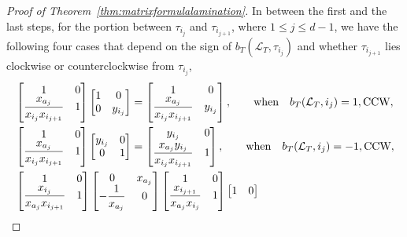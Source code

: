 \documentclass[pdftex]{sigma}
\numberwithin{equation}{section}
\theoremstyle{definition}
\begin{document}
\begin{proof}[Proof of Theorem~\ref{thm:matrixformulalamination}]
In between the first and the last steps, for the portion between $\tau_{i_j}$ and $\tau_{i_{j+1}}$, where $1\leq j\leq d-1$, we have the following four cases that depend on the sign of $b_T(\mathcal{L}_T, \tau_{i_j})$ and whether $\tau_{i_{j+1}}$ lies clockwise or counterclockwise from $\tau_{i_j}$,{\samepage
\begin{gather*}
\begin{split}
 &\begin{bmatrix}
 1 & 0\\
 \dfrac{x_{a_j}}{x_{i_j}x_{i_{j+1}}} & 1
 \end{bmatrix}
 \begin{bmatrix}
 1 & 0\\
 0 & y_{i_j}
 \end{bmatrix}=
 \begin{bmatrix}
 1 & 0\\
 \dfrac{x_{a_j}}{x_{i_j}x_{i_{j+1}}} & y_{i_j}
 \end{bmatrix} , \qquad\text{when}\quad b_T(\mathcal{L}_T, i_j)=1, \text{CCW},\\
& \begin{bmatrix}
 1 & 0\\
 \dfrac{x_{a_j}}{x_{i_j}x_{i_{j+1}}} & 1
 \end{bmatrix}
 \begin{bmatrix}
 y_{i_j} & 0\\
 0 & 1
 \end{bmatrix}=
 \begin{bmatrix}
 y_{i_j} & 0\vspace{1mm}\\
 \dfrac{x_{a_j}y_{i_j}}{x_{i_j}x_{i_{j+1}}} & 1
 \end{bmatrix}, \qquad\text{when}\quad b_T(\mathcal{L}_T, i_j)=-1, \text{CCW},\\
& \begin{bmatrix}
 1 & 0\\
 \dfrac{x_{i_j}}{x_{a_j}x_{i_{j+1}}} & 1\\
 \end{bmatrix}
 \begin{bmatrix}
 0 & x_{a_j}\\
 -\dfrac{1}{x_{a_j}} & 0
 \end{bmatrix}
 \begin{bmatrix}
 1 & 0\\
 \dfrac{x_{i_{j+1}}}{x_{a_j}x_{i_j}} & 1
 \end{bmatrix}
 \begin{bmatrix}
 1 & 0\\

\end{bmatrix}
\end{split}
\end{gather*}}
\end{proof}
\end{document}
